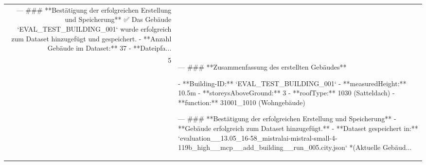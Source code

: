\documentclass[a4paper,11pt]{article}
\begin{document}
\begin{table}[ht]
\begin{tabular}{r p{12cm}}
---
\#\#\# **Bestätigung der erfolgreichen Erstellung und Speicherung**
✅ Das Gebäude `EVAL\_TEST\_BUILDING\_001` wurde erfolgreich zum Dataset hinzugefügt und gespeichert.
- **Anzahl Gebäude im Dataset:** 37
- **Dateipfa... \\
5 & ---
\#\#\# **Zusammenfassung des erstellten Gebäudes**

- **Building-ID:** `EVAL\_TEST\_BUILDING\_001`
- **measuredHeight:** 10.5m
- **storeysAboveGround:** 3
- **roofType:** 1030 (Satteldach)
- **function:** 31001\_1010 (Wohngebäude)

---
\#\#\# **Bestätigung der erfolgreichen Erstellung und Speicherung**
- **Gebäude erfolgreich zum Dataset hinzugefügt.**
- **Dataset gespeichert in:**
  `evaluation\_\_13.05\_16-58\_mistralai-mistral-small-4-119b\_high\_\_mcp\_\_add\_building\_\_run\_005.city.json`
  *(Aktuelle Gebäud... \\
\hline
\end{tabular}
\end{table}

\clearpage
\end{document}
